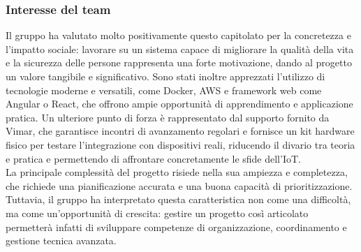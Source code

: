 \documentclass[a4paper,11pt]{article}
\begin{document}
\subsubsection{Interesse del team}
\parbox[t]{\linewidth}{%
Il gruppo ha valutato molto positivamente questo capitolato per la concretezza e
l'impatto sociale: lavorare su un sistema capace di migliorare la qualità della vita e
la sicurezza delle persone rappresenta una forte motivazione, dando al progetto un
valore tangibile e significativo. Sono stati inoltre apprezzati l'utilizzo di tecnologie
moderne e versatili, come Docker, AWS e framework web come Angular o React,
che offrono ampie opportunità di apprendimento e applicazione pratica. Un
ulteriore punto di forza è rappresentato dal supporto fornito da Vimar, che
garantisce incontri di avanzamento regolari e fornisce un kit hardware fisico per
testare l'integrazione con dispositivi reali, riducendo il divario tra teoria e pratica e
permettendo di affrontare concretamente le sfide dell'IoT.
\\
La principale complessità del progetto risiede nella sua ampiezza e completezza,
che richiede una pianificazione accurata e una buona capacità di prioritizzazione.
Tuttavia, il gruppo ha interpretato questa caratteristica non come una difficoltà, ma
come un'opportunità di crescita: gestire un progetto così articolato permetterà
infatti di sviluppare competenze di organizzazione, coordinamento e gestione
tecnica avanzata.
}
\end{document}
